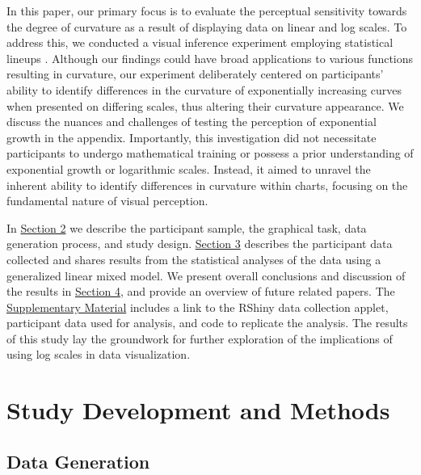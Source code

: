 \documentclass[12pt]{article}
\begin{document}
In this paper, our primary focus is to evaluate the perceptual
sensitivity towards the degree of curvature as a result of displaying
data on linear and log scales. To address this, we conducted a visual
inference experiment employing statistical lineups
\citep{buja_statistical_2009}. Although our findings could have broad
applications to various functions resulting in curvature, our experiment
deliberately centered on participants' ability to identify differences
in the curvature of exponentially increasing curves when presented on
differing scales, thus altering their curvature appearance. We discuss
the nuances and challenges of testing the perception of exponential
growth in the appendix. Importantly, this investigation did not
necessitate participants to undergo mathematical training or possess a
prior understanding of exponential growth or logarithmic scales.
Instead, it aimed to unravel the inherent ability to identify
differences in curvature within charts, focusing on the fundamental
nature of visual perception.

In \protect\hyperlink{methods}{Section 2} we describe the participant
sample, the graphical task, data generation process, and study design.
\protect\hyperlink{results}{Section 3} describes the participant data
collected and shares results from the statistical analyses of the data
using a generalized linear mixed model. We present overall conclusions
and discussion of the results in
\protect\hyperlink{conclusion-discussion}{Section 4}, and provide an
overview of future related papers. The
\protect\hyperlink{supplementary-material}{Supplementary Material}
includes a link to the RShiny data collection applet, participant data
used for analysis, and code to replicate the analysis. The results of
this study lay the groundwork for further exploration of the
implications of using log scales in data visualization.

\hypertarget{methods}{%
\section{Study Development and Methods}\label{methods}}

\hypertarget{data-generation}{%
\subsection{Data Generation}\label{data-generation}}
\end{document}
